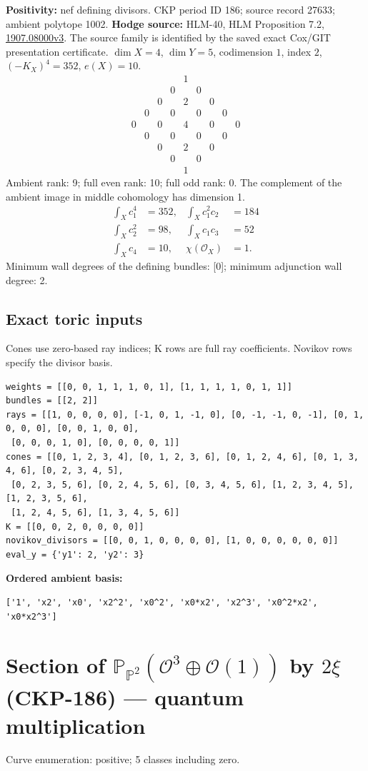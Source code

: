 \documentclass[10pt,a4paper]{article}
\newcommand{\hodge}[4]{\begin{array}{ccccccccc}
&&&&1&&&&\\&&&0&&0&&&\\&&0&&#1&&0&&\\&0&&#2&&#2&&0&\\
0&&#3&&#4&&#3&&0\\&0&&#2&&#2&&0&\\&&0&&#1&&0&&\\&&&0&&0&&&\\&&&&1&&&&\end{array}}
\begin{document}
\textbf{Positivity:} nef defining divisors.
CKP period ID 186; source record 27633; ambient polytope 1002.
\textbf{Hodge source:} HLM-40, HLM Proposition 7.2, \href{https://arxiv.org/abs/1907.08000v3}{1907.08000v3}.
The source family is identified by the saved exact Cox/GIT presentation certificate.
$\dim X=4$, $\dim Y=5$, codimension $1$, index $2$, $(-K_X)^4=352$, $e(X)=10$.
\[\hodge{2}{0}{0}{4}\]
Ambient rank: 9; full even rank: 10; full odd rank: 0. The complement of the ambient image in middle cohomology has dimension 1.
\[\begin{aligned}\int_Xc_1^4&=352,&\int_Xc_1^2c_2&=184\\\int_Xc_2^2&=98,&\int_Xc_1c_3&=52\\\int_Xc_4&=10,&\chi(\mathcal O_X)&=1.\end{aligned}\]
Minimum wall degrees of the defining bundles: [0]; minimum adjunction wall degree: 2.
\subsection*{Exact toric inputs}
Cones use zero-based ray indices; K rows are full ray coefficients. Novikov rows specify the divisor basis.

\begin{lstlisting}
weights = [[0, 0, 1, 1, 1, 0, 1], [1, 1, 1, 1, 0, 1, 1]]
bundles = [[2, 2]]
rays = [[1, 0, 0, 0, 0], [-1, 0, 1, -1, 0], [0, -1, -1, 0, -1], [0, 1, 0, 0, 0], [0, 0, 1, 0, 0],
 [0, 0, 0, 1, 0], [0, 0, 0, 0, 1]]
cones = [[0, 1, 2, 3, 4], [0, 1, 2, 3, 6], [0, 1, 2, 4, 6], [0, 1, 3, 4, 6], [0, 2, 3, 4, 5],
 [0, 2, 3, 5, 6], [0, 2, 4, 5, 6], [0, 3, 4, 5, 6], [1, 2, 3, 4, 5], [1, 2, 3, 5, 6],
 [1, 2, 4, 5, 6], [1, 3, 4, 5, 6]]
K = [[0, 0, 2, 0, 0, 0, 0]]
novikov_divisors = [[0, 0, 1, 0, 0, 0, 0], [1, 0, 0, 0, 0, 0, 0]]
eval_y = {'y1': 2, 'y2': 3}
\end{lstlisting}

\textbf{Ordered ambient basis:}
\begin{lstlisting}
['1', 'x2', 'x0', 'x2^2', 'x0^2', 'x0*x2', 'x2^3', 'x0^2*x2', 'x0*x2^3']
\end{lstlisting}

\clearpage\section*{Section of $\mathbb P_{\mathbb P^{2}}(\mathcal O^{3}\oplus \mathcal O(1))$ by $2\xi $ (CKP-186) --- quantum multiplication}

Curve enumeration: positive; 5 classes including zero.
\end{document}
